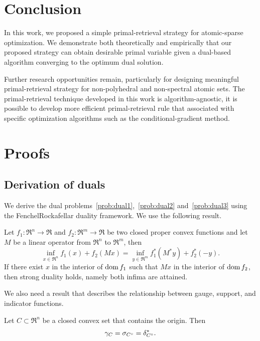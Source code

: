 \section{Conclusion}
In this work, we proposed a simple primal-retrieval strategy for atomic-sparse optimization. We demonstrate both theoretically and empirically that our proposed strategy can obtain desirable primal variable given a dual-based algorithm converging to the optimum dual solution. 

Further research opportunities remain, particularly for designing meaningful primal-retrieval strategy for non-polyhedral and non-spectral atomic sets. The primal-retrieval technique developed in this work is algorithm-agnostic, it is possible to develop more efficient primal-retrieval rule that associated with specific optimization algorithms such as the conditional-gradient method.


\section{Proofs}

\subsection{Derivation of duals}\label{app:duals}

We derive the dual problems~\eqref{prob:dual1},~\eqref{prob:dual2} and~\eqref{prob:dual3} using the Fenchel\textendash Rockafellar duality framework. We use the following result.
\begin{theorem}\label{thm-fenchel}
  Let $f_1:\Re^n\to\Re$ and $f_2:\Re^m\to\Re$ be two closed proper convex functions and let $M$ be a linear operator from $\Re^n$ to $\Re^m$, then
  \[\inf_{x \in \Re^n} f_1(x) + f_2(Mx) = \inf_{y \in \Re^m} f_1^*(M^*y) + f_2^*(-y).\]
  If there exist $x$ in the interior of $\operatorname{dom} f_1$ such that $Mx$ in the interior of $\operatorname{dom} f_2$, then strong duality holds, namely both infima are attained. 
\end{theorem}
We also need a result that describes the relationship between gauge, support, and indicator functions. 
\begin{proposition} \label{prop-conjugate-gauge}
  Let $C\subset\Re^n$ be a closed convex set that contains the origin. Then 
  \[\gamma_C = \sigma_{C^\circ}=\delta_{C^\circ}^*.\]
\end{proposition}

